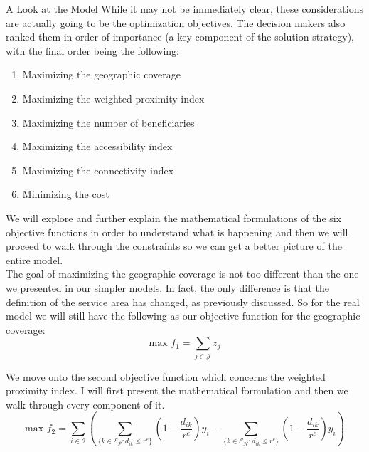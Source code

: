 \documentclass[12pt]{pom_thesis}
\theoremstyle{definition}
\begin{document}
\begin{chapter}{A Look at the Model}
While it may not be immediately clear, these considerations are actually going to be the optimization objectives. The decision makers also ranked them in order of importance (a key component of the solution strategy), with the final order being the following:
\begin{enumerate}
\item Maximizing the geographic coverage
\item Maximizing the weighted proximity index
\item Maximizing the number of beneficiaries
\item Maximizing the accessibility index
\item Maximizing the connectivity index
\item Minimizing the cost
\end{enumerate}
We will explore and further explain the mathematical formulations of the six objective functions in order to understand what is happening and then we will proceed to walk through the constraints so we can get a better picture of the entire model. \\

The goal of maximizing the geographic coverage is not too different than the one we presented in our simpler models. In fact, the only difference is that the definition of the service area has changed, as previously discussed. So for the real model we will still have the following as our objective function for the geographic coverage: 
\begin{equation} \label{objective-1}
\textrm{max } f_1 = \sum_{j \in \mathcal{J}} z_j
\end{equation}

We move onto the second objective function which concerns the weighted proximity index. I will first present the mathematical formulation and then we walk through every component of it.
\begin{equation} \label{objective-2}
\textrm{max } f_2 = \sum_{i \in \mathcal{I}}  \left( \sum_{\{k \in \mathcal{E_P}: d_{ik} \leq r^e  \}} \left( 1-\frac{d_{ik}}{r^e} \right) y_i  -   \sum_{\{k \in \mathcal{E_N}: d_{ik} \leq r^e  \}} \left( 1-\frac{d_{ik}}{r^e} \right) y_i   \right)
\end{equation}


\end{chapter}
\end{document}
